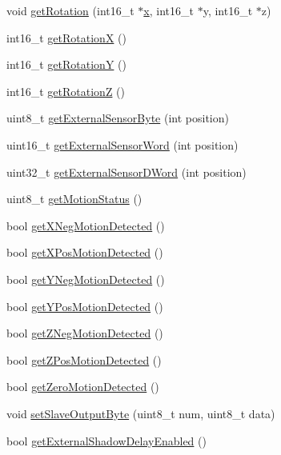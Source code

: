 \begin{DoxyCompactItemize}
void \hyperlink{classMPU6050_a8ca85b87e7e0230921062fce7889b0d1}{get\+Rotation} (int16\+\_\+t $\ast$\hyperlink{qualification__task_8cpp_a6150e0515f7202e2fb518f7206ed97dc}{x}, int16\+\_\+t $\ast$y, int16\+\_\+t $\ast$z)
\item 
int16\+\_\+t \hyperlink{classMPU6050_a268f52843a24992ff06a3f12392de584}{get\+RotationX} ()
\item 
int16\+\_\+t \hyperlink{classMPU6050_a97cbe7f10dd27e07bd78d1c25e4286b5}{get\+RotationY} ()
\item 
int16\+\_\+t \hyperlink{classMPU6050_ae0fee1ba996a2b6f914df6fc34e7da48}{get\+RotationZ} ()
\item 
uint8\+\_\+t \hyperlink{classMPU6050_a7f786ab4264f40e5a95e8937ec9adcc2}{get\+External\+Sensor\+Byte} (int position)
\item 
uint16\+\_\+t \hyperlink{classMPU6050_aaee15e48af7ba78660b5754f3bb5f37a}{get\+External\+Sensor\+Word} (int position)
\item 
uint32\+\_\+t \hyperlink{classMPU6050_afd8983f0911e37015434bebc85185fb2}{get\+External\+Sensor\+D\+Word} (int position)
\item 
uint8\+\_\+t \hyperlink{classMPU6050_af6e4fd231a9db99bd4270cf640eeae46}{get\+Motion\+Status} ()
\item 
bool \hyperlink{classMPU6050_a446d235905783c5b90637a6b6792ac76}{get\+X\+Neg\+Motion\+Detected} ()
\item 
bool \hyperlink{classMPU6050_a410af58f5ff5f74e4ef8d61495908226}{get\+X\+Pos\+Motion\+Detected} ()
\item 
bool \hyperlink{classMPU6050_a6c45be7b4aa9081c83ee0f4081bf0827}{get\+Y\+Neg\+Motion\+Detected} ()
\item 
bool \hyperlink{classMPU6050_ad959ec84b9fe9f7e416b7af252f37abc}{get\+Y\+Pos\+Motion\+Detected} ()
\item 
bool \hyperlink{classMPU6050_a3601b732eb15644212b8f29cf396e142}{get\+Z\+Neg\+Motion\+Detected} ()
\item 
bool \hyperlink{classMPU6050_a33c766cd415fc5780417b1ed76717875}{get\+Z\+Pos\+Motion\+Detected} ()
\item 
bool \hyperlink{classMPU6050_a384765351b5c4bd2b6efec9ed71ad1b7}{get\+Zero\+Motion\+Detected} ()
\item 
void \hyperlink{classMPU6050_a34a1def575f6abcd464afe954de8a461}{set\+Slave\+Output\+Byte} (uint8\+\_\+t num, uint8\+\_\+t data)
\item 
bool \hyperlink{classMPU6050_a0e5cb13838298609b5260fd1558f8c92}{get\+External\+Shadow\+Delay\+Enabled} ()

\end{DoxyCompactItemize}

